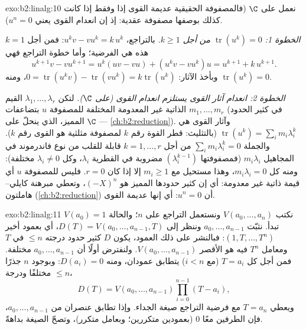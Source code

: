 \begin{solution}{exo:b2:linalg:10}
نعمل على $\C$ (فالمصفوفة الحقيقية عديمة القوى إذا وفقط إذا كانت كذلك بوصفها
مصفوفة عقدية: إذ إن انعدام القوى يعني $u^n = 0$).

\emph{الخطوة 1: $\operatorname{tr}(u^k) = 0$ من أجل $k \geq 1$.} بالتراجع،
$u^k v - v u^k = k\, u^k$: فمن أجل $k = 1$ هذه هي الفرضية؛ وأما خطوة التراجع فهي
\[
u^{k+1}v - vu^{k+1} = u^k(uv - vu) + (u^k v - v u^k)u
= u^{k+1} + k\,u^{k+1} .
\]
وبأخذ الآثار: $0 = \operatorname{tr}(u^k v) -
\operatorname{tr}(vu^k) = k \operatorname{tr}(u^k)$، ومنه
$\operatorname{tr}(u^k) = 0$.

\emph{الخطوة 2: انعدام آثار القوى يستلزم انعدام القوى (على $\C$).} لتكن
$\lambda_1, \dots, \lambda_r$ القيم الذاتية غير المعدومة المختلفة
للمصفوفة $u$ بتضاعفات $m_1, \dots, m_r$ (في كثير الحدود المميز،
الذي ينحلّ على $\C$ --- \cref{ch:b2:reduction}). وآثار القوى هي $\operatorname{tr}(u^k) =
\sum_i m_i \lambda_i^k$ (بالتثليث: قطر القوة رقم $k$ لمصفوفة
مثلثية هو القوى رقم $k$). والجملة $\sum_i m_i
\lambda_i^k = 0$ من أجل $k = 1, \dots, r$ قابلة للقلب من نوع فاندرموند في
المجاهيل $m_i\lambda_i$ (فمصفوفتها $(\lambda_i^{k-1})$ مضروبة في
القطرية $\lambda_i$، وكل $\lambda_i \neq 0$ مختلفة): ومنه كل $m_i
\lambda_i = 0$، وهذا مستحيل مع $m_i \geq 1$ إلا إذا كان $r = 0$. فليس للمصفوفة $u$
أي قيمة ذاتية غير معدومة: أي إن كثير حدودها المميز هو
$(-X)^n$، وتعطي مبرهنة كايلي--هاملتون (\cref{ch:b2:reduction}) أن $u^n
= 0$: أي إنها عديمة القوى.
\end{solution}

\begin{solution}{exo:b2:linalg:11}
نكتب $V(a_0, \dots, a_n)$  ونستعمل التراجع على $n$؛
والحالة $V(a_0) = 1$ تبدأ. نثبّت $a_0, \dots, a_{n-1}$ وننظر إلى $D(T) =
V(a_0, \dots, a_{n-1}, T)$، أي  بعمود أخير $(1,
T, \dots, T^n)$: فبالنشر على ذلك العمود، يكون $D$ كثير حدود
درجته $\leq n$ في $T$ ومعامل $T^n$ فيه هو الأقصر
$V(a_0, \dots, a_{n-1})$. ولنفترض أولًا أن $a_0, \dots,
a_{n-1}$ مختلفة. فمن أجل كل $T = a_i$ (مع $i < n$) يتطابق عمودان،
ومنه $D(a_i) = 0$: وبوجود $n$ جذرًا مختلفًا ودرجة
$\leq n$،
\[
D(T) = V(a_0, \dots, a_{n-1}) \prod_{i=0}^{n-1}(T - a_i),
\]
ويعطي $T = a_n$ مع فرضية التراجع صيغة
الجداء. وإذا تطابق عنصران من $a_0, \dots, a_{n-1}$، فإن الطرفين معًا
$0$ (بعمودين متكررين؛ وبعامل متكرر)، وتصحّ الصيغة
بداهةً.
\end{solution}


